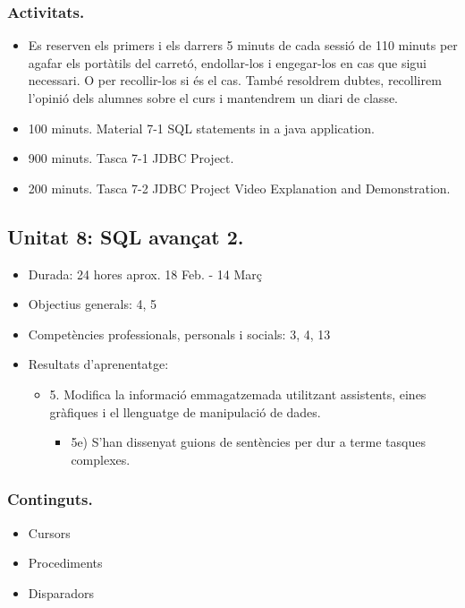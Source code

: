 \documentclass[catalan, a4paper, 12pt, titlepage]{article}
\begin{document}
  \subsubsection{Activitats.}
  \begin{itemize}
          \item Es reserven els primers i els darrers 5 minuts de cada sessió de 110 minuts per agafar els portàtils del carretó, endollar-los i engegar-los en cas que sigui necessari. O per recollir-los si és el cas. També resoldrem dubtes, recollirem l'opinió dels alumnes sobre el curs i mantendrem un diari de classe.
	  \item 100 minuts. Material 7-1 SQL statements in a java application.
	  \item 900 minuts. Tasca 7-1 JDBC Project.
	  \item 200 minuts. Tasca 7-2 JDBC Project Video Explanation and Demonstration.
  \end{itemize}

  \subsection{Unitat 8: SQL avançat 2.}

  \begin{itemize}
	\item Durada: 24 hores aprox. 18 Feb. - 14 Març
	\item Objectius generals: 4, 5
	\item Competències professionals, personals i socials: 3, 4, 13
	\item Resultats d'aprenentatge: 
		\begin{itemize}
			\item 5. Modifica la informació emmagatzemada utilitzant assistents, eines gràfiques i el llenguatge de manipulació de dades.
				\begin{itemize}
					\item 5e) S'han dissenyat guions de sentències per dur a terme tasques complexes.
				\end{itemize}
		\end{itemize}
  \end{itemize}

  \subsubsection{Continguts.}
  \begin{itemize}
	  \item Cursors
	  \item Procediments
	  \item Disparadors
  \end{itemize}
\end{document}
